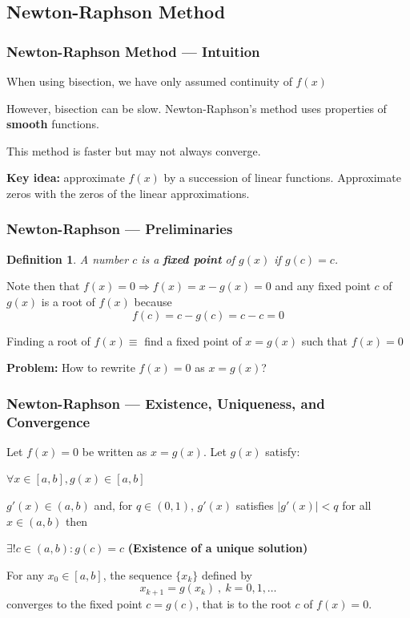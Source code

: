 \documentclass[11pt,xcolor={svgnames},aspectratio=169,usepdftitle=false]{beamer}
\let\toneitemize\itemize
\let\ttwoitemize\enditemize
\renewenvironment{itemize}{\toneitemize\addtolength{\itemsep}{0.7\baselineskip}}{\ttwoitemize}
\let\toneenumer\enumerate
\let\ttwoenumer\endenumerate
\renewenvironment{enumerate}{\toneenumer\addtolength{\itemsep}{0.7\baselineskip}}{\ttwoenumer}
\newtheorem{definition}{Definition}
\begin{document}
\subsection{Newton-Raphson Method}

\begin{frame}
  \frametitle{Newton-Raphson Method --- Intuition}
\begin{itemize}
  \item When using bisection, we have only assumed continuity of $f(x)$
  \item However, bisection can be slow. Newton-Raphson's method uses properties of \alert{\textbf{smooth}} functions.
  \item This method is faster but may not always converge.
  \item \alert{\textbf{Key idea:}} approximate $f(x)$ by a succession of linear functions. Approximate zeros with the zeros of the linear approximations.
\end{itemize}
\end{frame}

\begin{frame}
  \frametitle{Newton-Raphson --- Preliminaries}
\begin{definition}
A number $c$ is a \alert{\textbf{fixed point}} of $g(x)$ if $g(c) = c$.
\end{definition}
\begin{itemize}
  \item Note then that $f(x) = 0 \Rightarrow f(x) = x - g(x) = 0$ and any fixed point $c$ of $g(x)$ is a root of $f(x)$ because
  \[
  f(c) = c - g(c) = c - c = 0
  \]
  \item Finding a root of $f(x) \equiv$ find a fixed point of  $x = g(x)$ such that $f(x) = 0$
  \item \alert{\textbf{Problem:}} How to rewrite $f(x) = 0$ as $x = g(x)$?
\end{itemize}
\end{frame}

\begin{frame}
  \frametitle{Newton-Raphson --- Existence, Uniqueness, and Convergence}
\begin{theorem}\label{thm:fixed_point}
Let $f(x) = 0$ be written as $x = g(x)$. Let $g(x)$ satisfy:
\begin{enumerate}
  \item $\forall x\in [a,b], g(x)\in [a,b]$
  \item $g'(x)\in (a, b)$ and, for $q\in(0,1)$, $g'(x)$ satisfies $\lvert g'(x) \rvert < q$ for all $x\in (a,b)$
\end{enumerate}
then
\begin{enumerate}
  \item $\exists! c\in(a,b) : g(c) = c$ {\footnotesize \alert{\textbf{(Existence of a unique solution)}}}
  \item For any $x_0\in [a, b]$, the sequence $\{x_k\}$ defined by
  \[
  x_{k+1} = g(x_k) \ , \ k = 0,1,\ldots
  \]
  converges to the fixed point $c = g(c)$, that is to the root $c$ of $f(x) = 0$.
\end{enumerate}
\end{theorem}
\end{frame}
\end{document}
